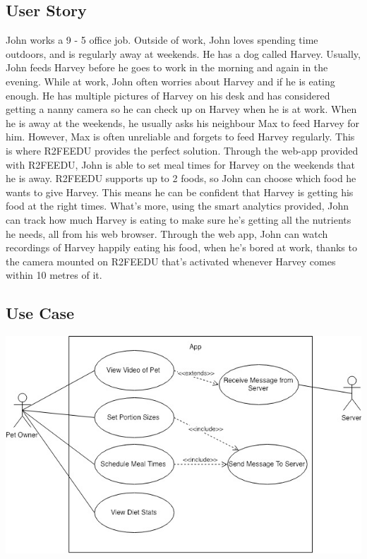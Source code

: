     \subsection{User Story}
    John works a 9 - 5 office job. Outside of work, John loves spending time outdoors, and is regularly away at weekends. He has a dog called Harvey. Usually, John feeds Harvey before he goes to work in the morning and again in the evening. While at work, John often worries about Harvey and if he is eating enough. He has multiple pictures of Harvey on his desk and has considered getting a nanny camera so he can check up on Harvey when he is at work. When he is away at the weekends, he usually asks his neighbour Max to feed Harvey for him. However, Max is often unreliable and forgets to feed Harvey regularly. This is where R2FEEDU provides the perfect solution. Through the web-app provided with R2FEEDU, John is able to set meal times for Harvey on the weekends that he is away. R2FEEDU supports up to 2 foods, so John can choose which food he wants to give Harvey. This means he can be confident that Harvey is getting his food at the right times. What’s more, using the smart analytics provided, John can track how much Harvey is eating to make sure he’s getting all the nutrients he needs, all from his web browser. Through the web app, John can watch recordings of Harvey happily eating his food, when he’s bored at work, thanks to the camera mounted on R2FEEDU that’s activated whenever Harvey comes within 10 metres of it.

    \subsection{Use Case}
    
    \includegraphics[width=14cm]{UseCaseDiagram.jpg} \\

